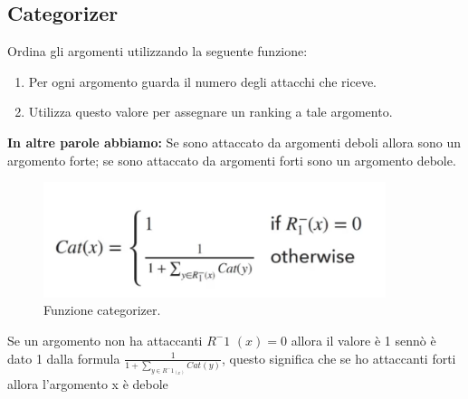     \subsection{Categorizer}
    Ordina gli argomenti utilizzando la seguente funzione:
    \begin{enumerate}
        \item Per ogni argomento guarda il numero degli attacchi che riceve.
        \item Utilizza questo valore per assegnare un ranking a tale argomento.
    \end{enumerate}
    \textbf{In altre parole abbiamo:} Se sono attaccato da argomenti deboli allora sono un argomento forte; se sono attaccato da argomenti forti sono un argomento debole.
    \begin{figure}[H]
        \centering
        \includegraphics[width=10cm, keepaspectratio]{img/Cap8/quantitativo1.png}
        \caption{Funzione categorizer.}
    \end{figure}
    Se un argomento non ha attaccanti $R^-1$ $(x) = 0$ allora il valore è 1 sennò è dato 1 dalla formula
$\frac{1}{1+\sum_{y\in R^-1_(x)} Cat(y)}$, questo significa che se ho attaccanti forti allora l'argomento x è debole

